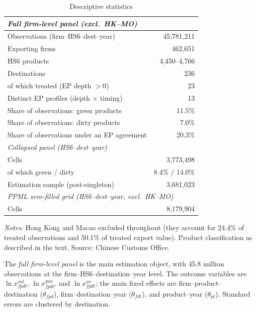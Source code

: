 \documentclass[12pt]{article}
\begin{document}
\begin{table}[htbp]
\centering
\caption{Descriptive statistics}
\label{tab:descriptives}
\small
\begin{threeparttable}
\begin{tabular}{lr}
\toprule
\multicolumn{2}{l}{\textit{Full firm-level panel (excl.\ HK--MO)}} \\
\midrule
Observations (firm--HS6--dest--year) & 45{,}781{,}211 \\
Exporting firms & 462{,}651 \\
HS6 products & 4{,}450--4{,}766 \\
Destinations & 236 \\
\quad of which treated (EP depth $>0$) & 23 \\
Distinct EP profiles (depth $\times$ timing) & 13 \\
Share of observations: green products & 11.5\% \\
Share of observations: dirty products & 7.0\% \\
Share of observations under an EP agreement & 20.3\% \\
\midrule
\multicolumn{2}{l}{\textit{Collapsed panel (HS6--dest--year)}} \\
\midrule
Cells & 3{,}773{,}498 \\
\quad of which green / dirty & 8.4\% / 14.0\% \\
Estimation sample (post-singleton) & 3{,}681{,}023 \\
\midrule
\multicolumn{2}{l}{\textit{PPML zero-filled grid (HS6--dest--year, excl.\ HK--MO)}} \\
\midrule
Cells & 8{,}179{,}904 \\
\bottomrule
\end{tabular}
\begin{tablenotes}\footnotesize
\item \emph{Notes:} Hong Kong and Macao excluded throughout (they account for 24.4\% of treated
observations and 50.1\% of treated export value). Product classification as described
in the text. Source: Chinese Customs Office.
\end{tablenotes}
\end{threeparttable}
\end{table}

The \emph{full firm-level panel} is the main estimation object, with 45.8 million
observations at the firm--HS6--destination--year level. The outcome variables are
$\ln x^{val}_{fpdt}$, $\ln x^{qua}_{fpdt}$, and $\ln x^{uv}_{fpdt}$; the main fixed
effects are firm--product--destination ($\theta_{fpd}$), firm--destination--year
($\theta_{fdt}$), and product--year ($\theta_{pt}$). Standard errors are clustered by
destination.
\end{document}
